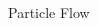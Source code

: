 \begin{frame}{Particle Flow}
\begin{columns}[T]
\begin{column}{0.40\textwidth}
  \end{column}
\end{columns}
\end{frame}


